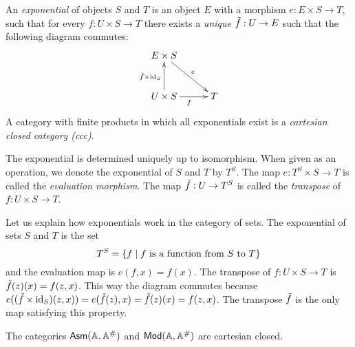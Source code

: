 \begin{definition}
  An \emph{exponential} of objects $S$ and $T$ is an object $E$ with a
  morphism $e : E \times S \to T$, such that for every $f : U \times S
  \to T$ there exists a \emph{unique} $\tilde{f} : U \to E$ such that
  the following diagram commutes:
  \begin{equation*}
    \xymatrix@+0.5em{
      {E \times S}
      \ar[rd]^{e}
      &
      \\
      {U \times S}
      \ar[r]_{f}
      \ar[u]^{\curry{f} \times \id_S}
      &
      {T}
    }
  \end{equation*}
  A category with finite products in which all exponentials exist is a
  \emph{cartesian closed category (ccc)}.
\end{definition}

\noindent
%
The exponential is determined uniquely up to isomorphism. When given
as an operation, we denote the exponential of $S$ and $T$ by $T^S$.
The map $e : T^S \times S \to T$ is called the \emph{evaluation
  morphism}. The map $\tilde{f} : U \to T^S$ is called the
\emph{transpose} of $f : U \times S \to T$.

Let us explain how exponentials work in the category of sets. The
exponential of sets $S$ and $T$ is the set
%
\begin{equation*}
  T^S = \{f \mid \text{$f$ is a function from $S$ to $T$}\}
\end{equation*}
%
and the evaluation map is $e(f,x) = f(x)$. The transpose of $f : U
\times S \to T$ is $\tilde{f}(z)(x) = f (z, x)$. This way the diagram
commutes because $e((\tilde{f} \times \mathrm{id}_S)(z, x)) = e(\tilde{f}(z),
x) = \tilde{f}(z)(x) = f(z,x)$. The transpose $\tilde{f}$ is the only
map satisfying this property.

\begin{proposition}
  The categories $\mathsf{Asm}(\mathbb{A},\mathbb{A}^{\#})$ and $\mathsf{Mod}(\mathbb{A},\mathbb{A}^{\#})$ are cartesian closed.
\end{proposition}

